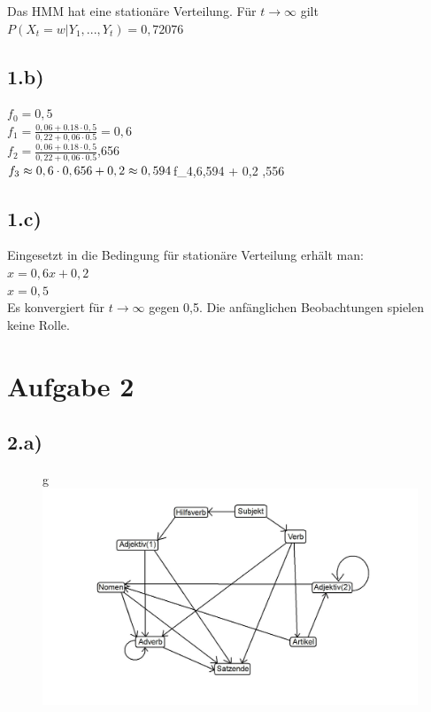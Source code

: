\documentclass[a4paper]{article}
\begin{document}
Das HMM hat eine stationäre Verteilung. Für $t\rightarrow \infty$ gilt\\
$ P(X_t=w|Y_1,...,Y_t)=0,72076$
\subsection*{1.b)}
$f_0 = 0,5$\\
$f_1=\frac{0,06+0.18\cdot 0,5}{0,22+0,06\cdot 0.5} = 0,6$\\
$f_2=\frac{0,06+0.18\cdot 0,5}{0,22+0,06\cdot 0.5}$,656\\
$f_3\approx 0,6\cdot 0,656 + 0,2 \approx 0,594\\
$f_4,6,594 + 0,2 ,556\\

\subsection*{1.c)}
Eingesetzt in die Bedingung für stationäre Verteilung erhält man:\\
$x=0,6x+0,2$\\
$x=0,5$\\
Es konvergiert für $t\rightarrow \infty$ gegen 0,5. Die anfänglichen Beobachtungen spielen keine Rolle.
\section*{Aufgabe 2}

\subsection*{2.a)}
\begin{figure}[!htbp]
\centering
g\includegraphics[width = 1\columnwidth]{blatt6aufgabe2a}
\end{figure}
\end{document}
